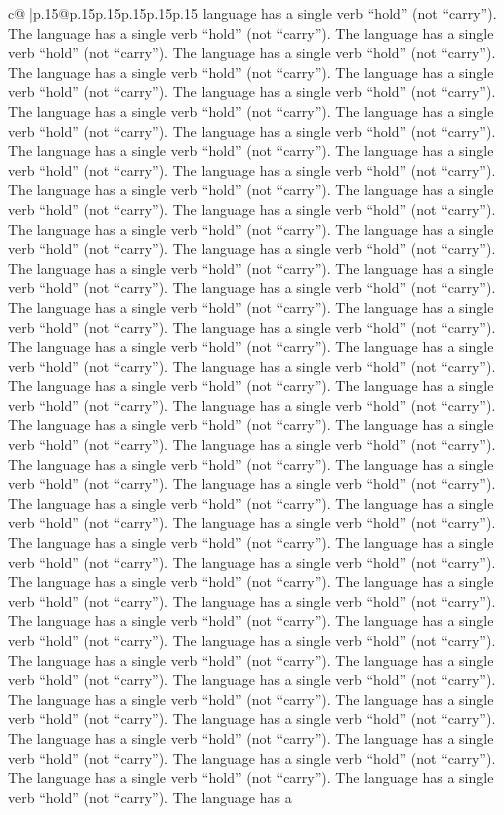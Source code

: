 \documentclass{article}
\begin{document}
{\begin{supertabular}{c@{$\;$}|p{.15\linewidth}@{}p{.15\linewidth}p{.15\linewidth}p{.15\linewidth}p{.15\linewidth}p{.15\linewidth}}
{{{language has a single verb “hold” (not “carry”). The language has a single verb “hold” (not “carry”). The language has a single verb “hold” (not “carry”). The language has a single verb “hold” (not “carry”). The language has a single verb “hold” (not “carry”). The language has a single verb “hold” (not “carry”). The language has a single verb “hold” (not “carry”). The language has a single verb “hold” (not “carry”). The language has a single verb “hold” (not “carry”). The language has a single verb “hold” (not “carry”). The language has a single verb “hold” (not “carry”). The language has a single verb “hold” (not “carry”). The language has a single verb “hold” (not “carry”). The language has a single verb “hold” (not “carry”). The language has a single verb “hold” (not “carry”). The language has a single verb “hold” (not “carry”). The language has a single verb “hold” (not “carry”). The language has a single verb “hold” (not “carry”). The language has a single verb “hold” (not “carry”). The language has a single verb “hold” (not “carry”). The language has a single verb “hold” (not “carry”). The language has a single verb “hold” (not “carry”). The language has a single verb “hold” (not “carry”). The language has a single verb “hold” (not “carry”). The language has a single verb “hold” (not “carry”). The language has a single verb “hold” (not “carry”). The language has a single verb “hold” (not “carry”). The language has a single verb “hold” (not “carry”). The language has a single verb “hold” (not “carry”). The language has a single verb “hold” (not “carry”). The language has a single verb “hold” (not “carry”). The language has a single verb “hold” (not “carry”). The language has a single verb “hold” (not “carry”). The language has a single verb “hold” (not “carry”). The language has a single verb “hold” (not “carry”). The language has a single verb “hold” (not “carry”). The language has a single verb “hold” (not “carry”). The language has a single verb “hold” (not “carry”). The language has a single verb “hold” (not “carry”). The language has a single verb “hold” (not “carry”). The language has a single verb “hold” (not “carry”). The language has a single verb “hold” (not “carry”). The language has a single verb “hold” (not “carry”). The language has a single verb “hold” (not “carry”). The language has a single verb “hold” (not “carry”). The language has a single verb “hold” (not “carry”). The language has a single verb “hold” (not “carry”). The language has a single verb “hold” (not “carry”). The language has a single verb “hold” (not “carry”). The language has a single verb “hold” (not “carry”). The language has a single verb “hold” (not “carry”). The language has a single verb “hold” (not “carry”). The language has a single verb “hold” (not “carry”). The language has a single verb “hold” (not “carry”). The language has a single verb “hold” (not “carry”). The language has a single verb “hold” (not “carry”). The language has a single verb “hold” (not “carry”). The language has a single verb “hold” (not “carry”). The language has a single verb “hold” (not “carry”). The language has a single verb “hold” (not “carry”). The language has a }}}
\end{supertabular}}
\end{document}
